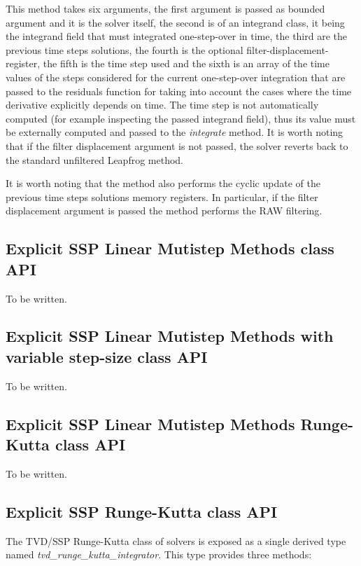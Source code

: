 This method takes six arguments, the first argument is passed as bounded argument and it is the solver itself, the second is of an integrand class, it being the integrand field that must integrated one-step-over in time, the third are the previous time steps solutions, the fourth is the optional filter-displacement-register, the fifth is the time step used and the sixth is an array of the time values of the steps considered for the current one-step-over integration that are passed to the residuals function for taking into account the cases where the time derivative explicitly depends on time. The time step is not automatically computed (for example inspecting the passed integrand field), thus its value must be externally computed and passed to the \emph{integrate} method. It is worth noting that if the filter displacement argument is not passed, the solver reverts back to the standard unfiltered Leapfrog method.

It is worth noting that the method also performs the cyclic update of the previous time steps solutions memory registers. In particular, if the filter displacement argument is passed the method performs the RAW filtering.

\subsection{Explicit SSP Linear Mutistep Methods class API}

{\color{red}To be written.}

\subsection{Explicit SSP Linear Mutistep Methods with variable step-size class API}

{\color{red}To be written.}

\subsection{Explicit SSP Linear Mutistep Methods Runge-Kutta class API}

{\color{red}To be written.}

\subsection{Explicit SSP Runge-Kutta class API}\label{subsec:solver_tvd_rk}

The TVD/SSP Runge-Kutta class of solvers is exposed as a single derived type named \emph{tvd\_runge\_kutta\_integrator}. This type provides three methods:

